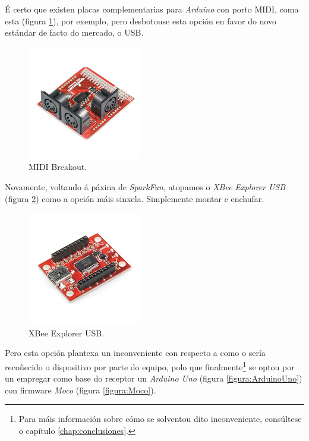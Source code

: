   É certo que existen placas complementarias para \textit{Arduino} con porto
  MIDI, coma esta \cite{SparkFunMIDI} (figura \ref{figura:SparkFunMIDI}), por
  exemplo, pero desbotouse esta opción en favor do novo estándar de facto do
  mercado, o USB. \\

  \begin{figure}[htbp]
   \centering
   \includegraphics[scale=3.0,keepaspectratio=true]{./imagenes/sparkfun-midi.jpg}
   \caption{MIDI Breakout.}
   \label{figura:SparkFunMIDI}
  \end{figure}

  Novamente, voltando á páxina de \textit{SparkFun}, atopamos o
  \textit{XBee Explorer USB} \cite{XBeeExplorer} (figura
  \ref{figura:XBeeExplorer}) como a opción máis sinxela. Simplemente montar e
   enchufar. \\

  \begin{figure}[htbp]
   \centering
   \includegraphics[scale=3.0,keepaspectratio=true]{./imagenes/xbee-explorer.jpg}
   \caption{XBee Explorer USB.}
   \label{figura:XBeeExplorer}
  \end{figure}

  Pero esta opción plantexa un inconveniente con respecto a como o sería
  recoñecido o dispositivo por parte do equipo, polo que
  finalmente\footnote{Para máis información sobre cómo se solventou dito
  inconveniente, consúltese o capítulo \ref{chap:conclusiones}.} se optou
  por un empregar como base do receptor un \textit{Arduino Uno} (figura
  \ref{figura:ArduinoUno}) con firmware \textit{Moco} (figura
  \ref{figura:Moco}). \\

